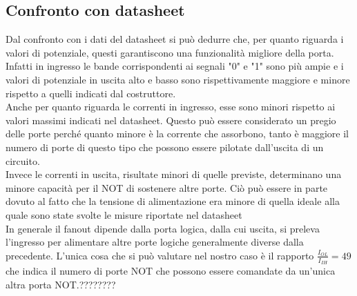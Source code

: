 \subsection{Confronto con datasheet}
Dal confronto con i dati del datasheet si può dedurre che, per quanto riguarda i valori di potenziale, questi garantiscono una funzionalità migliore della porta. Infatti in ingresso le bande corrispondenti ai segnali "0" e "1" sono più ampie e i valori di potenziale in uscita alto e basso sono rispettivamente maggiore e minore rispetto a quelli indicati dal costruttore.\\
Anche per quanto riguarda le correnti in ingresso, esse sono minori rispetto ai valori massimi indicati nel datasheet. Questo può essere considerato un pregio delle porte perché quanto minore è la corrente che assorbono, tanto è maggiore il numero di porte di questo tipo che possono essere pilotate dall'uscita di un circuito.\\
Invece le correnti in uscita, risultate minori di quelle previste, determinano una minore capacità per il NOT di sostenere altre porte. Ciò può essere in parte dovuto al fatto che la tensione di alimentazione era minore di quella ideale alla quale sono state svolte le misure riportate nel datasheet\\
In generale il fanout dipende dalla porta logica, dalla cui uscita, si preleva l'ingresso per alimentare altre porte logiche generalmente diverse dalla precedente. L'unica cosa che si può valutare nel nostro caso è il rapporto $\frac{I_{OL}}{I_{IH}}= 49$ che indica il numero di porte NOT che possono essere comandate da un'unica altra porta NOT.????????